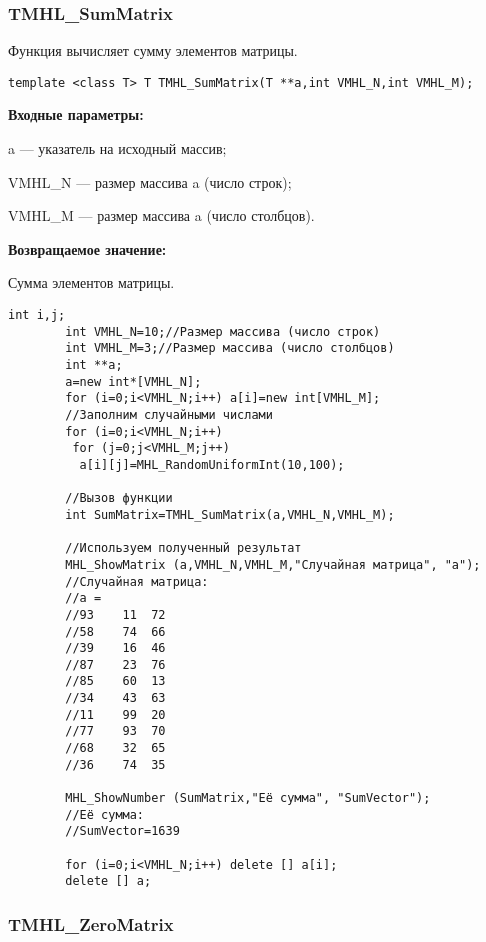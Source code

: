 \documentclass[a4paper,12pt]{article}
\begin{document}
\subsubsection{TMHL\_SumMatrix}\label{TMHL_SumMatrix}

Функция вычисляет сумму элементов матрицы.


\begin{lstlisting}[label=code_syntax_TMHL_SumMatrix,caption=Синтаксис]
template <class T> T TMHL_SumMatrix(T **a,int VMHL_N,int VMHL_M);
\end{lstlisting}

\textbf{Входные параметры:}

 a --- указатель на исходный массив;
 
 VMHL\_N --- размер массива a (число строк);
 
 VMHL\_M --- размер массива a (число столбцов).

\textbf{Возвращаемое значение:}

 Сумма элементов матрицы.


\begin{lstlisting}[label=code_use_TMHL_SumMatrix,caption=Пример использования]
        int i,j;
        int VMHL_N=10;//Размер массива (число строк)
        int VMHL_M=3;//Размер массива (число столбцов)
        int **a;
        a=new int*[VMHL_N];
        for (i=0;i<VMHL_N;i++) a[i]=new int[VMHL_M];
        //Заполним случайными числами
        for (i=0;i<VMHL_N;i++)
         for (j=0;j<VMHL_M;j++)
          a[i][j]=MHL_RandomUniformInt(10,100);

        //Вызов функции
        int SumMatrix=TMHL_SumMatrix(a,VMHL_N,VMHL_M);

        //Используем полученный результат
        MHL_ShowMatrix (a,VMHL_N,VMHL_M,"Случайная матрица", "a");
        //Случайная матрица:
        //a =
        //93	11	72
        //58	74	66
        //39	16	46
        //87	23	76
        //85	60	13
        //34	43	63
        //11	99	20
        //77	93	70
        //68	32	65
        //36	74	35

        MHL_ShowNumber (SumMatrix,"Её сумма", "SumVector");
        //Её сумма:
        //SumVector=1639

        for (i=0;i<VMHL_N;i++) delete [] a[i];
        delete [] a;
\end{lstlisting}

\subsubsection{TMHL\_ZeroMatrix}\label{TMHL_ZeroMatrix}
\end{document}
